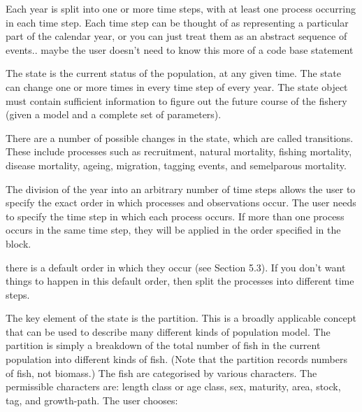 Each year is split into one or more time steps, with at least one process occurring in each time step. Each time step can be thought of as representing a particular part of the calendar year, or you can just treat them as an abstract sequence of events.. maybe the user doesn't need to know this more of a code base statement

The state is the current status of the population, at any given time. The state can change one or more times in every time step of every year. The state object must contain sufficient information to figure out the future course of the fishery (given a model and a complete set of parameters).

There are a number of possible changes in the state, which are called transitions. These include processes such as recruitment, natural mortality, fishing mortality, disease mortality, ageing, migration, tagging events, and semelparous mortality.

The division of the year into an arbitrary number of time steps allows the user to specify the exact order in which processes and observations occur. The user needs to specify the time step in which each process occurs. If more than one process occurs in the same time step, they will be applied in the order specified in the  block.

there is a default order in which they occur (see Section 5.3). If you don’t want things to happen in this default order, then split the processes into different time steps.


The key element of the state is the partition. This is a broadly applicable concept that can be used to describe many different kinds of population model. The partition is simply a breakdown of the total number of fish in the current population into different kinds of fish. (Note that the partition records numbers of fish, not biomass.) The fish are categorised by various characters. The permissible characters are: length class or age class, sex, maturity, area, stock, tag, and growth-path. The user chooses:

